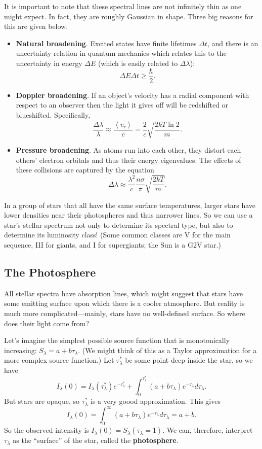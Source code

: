 \documentclass[../a062main.tex]{subfiles}
\begin{document}
It is important to note that these spectral lines are not infinitely thin as one might expect.
In fact, they are roughly Gaussian in shape.
Three big reasons for this are given below.
\begin{itemize}
    \item \textbf{Natural broadening}.
    Excited states have finite lifetimes $\Delta t$, and there is an uncertainty relation in quantum mechanics which relates this to the uncertainty in energy $\Delta E$ (which is easily related to $\Delta \lambda$):
    \[ \Delta E \Delta t \geq \frac{\hbar}{2}. \]

    \item \textbf{Doppler broadening}.
    If an object's velocity has a radial component with respect to an observer then the light it gives off will be redshifted or blueshifted.
    Specifically,
    \[ \frac{\Delta \lambda}{\lambda} \approx \frac{\left< v_r \right>}{c} = \frac{2}{c} \sqrt{\frac{2kT \ln 2}{m}}. \]

    \item \textbf{Pressure broadening}.
    As atoms run into each other, they distort each others' electron orbitals and thus their energy eigenvalues.
    The effects of these collisions are captured by the equation
    \[ \Delta \lambda \approx \frac{\lambda^2}{c} \frac{n\sigma}{\pi} \sqrt{\frac{2kT}{m}}. \]
\end{itemize}
In a group of stars that all have the same surface temperatures, larger stars have lower densities near their photospheres and thus narrower lines.
So we can use a star's stellar spectrum not only to determine its spectral type, but also to determine its luminosity class!
(Some common classes are V for the main sequence, III for giants, and I for supergiants; the Sun is a G2V star.)

\subsection*{The Photosphere}
All stellar spectra have absorption lines, which might suggest that stars have some emitting surface upon which there is a cooler atmosphere.
But reality is much more complicated---mainly, stars have no well-defined surface.
So where does their light come from?

Let's imagine the simplest possible source function that is monotonically increasing: $S_\lambda = a + b\tau_\lambda$.
(We might think of this as a Taylor approximation for a more complex source function.)
Let $\tau_\lambda^*$ be some point deep inside the star, so we have
\[ I_\lambda(0) = I_\lambda(\tau_\lambda^*)e^{-\tau_\lambda^*} + \int_{0}^{\tau_\tau^*} (a + b\tau_\lambda)e^{-\tau_\lambda} d\tau_\lambda. \]
But stars are opaque, so $\tau_\lambda^*$ is a very goood approximation.
This gives
\[ I_\lambda(0) = \int_{0}^{\infty} (a + b\tau_\lambda) e^{-\tau_\lambda} d\tau_\lambda = a + b. \]
So the observed intensity is $I_\lambda(0) = S_\lambda(\tau_\lambda = 1)$.
We can, therefore, interpret $\tau_\lambda$ as the ``surface'' of the star, called the \textbf{photosphere}.
\end{document}
